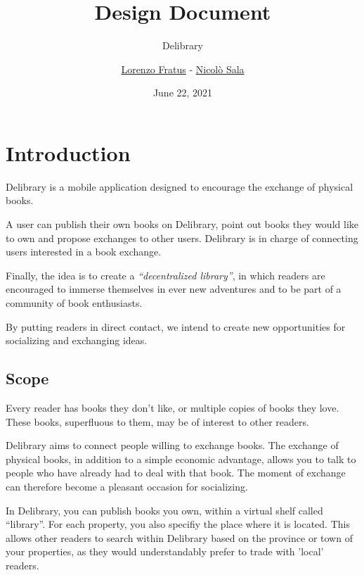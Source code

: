 
\graphicspath{ {assets/} }

\title{Design Document}
\subtitle{Delibrary}
\author{\href{https://github.com/lorenzofratus}{Lorenzo Fratus} - \href{https://github.com/nicheosala}{Nicolò Sala}}
\date{June 22, 2021}



\maketitle
\tableofcontents



\chapter{Introduction}
Delibrary is a mobile application designed to encourage the exchange of physical books.

A user can publish their own books on Delibrary, point out books they would like to own and propose exchanges to other users.
Delibrary is in charge of connecting users interested in a book exchange.

Finally, the idea is to create a \emph{``decentralized library''}, in which readers are encouraged to immerse themselves
in ever new adventures and to be part of a community of book enthusiasts.

By putting readers in direct contact, we intend to create new opportunities for socializing and exchanging ideas.

\section{Scope}
Every reader has books they don't like, or multiple copies of books they love.
These books, superfluous to them, may be of interest to other readers.

Delibrary aims to connect people willing to exchange books.
The exchange of physical books, in addition to a simple economic advantage, allows you to talk to people who have already had to deal with that book.
The moment of exchange can therefore become a pleasant occasion for socializing.

In Delibrary, you can publish books you own, within a virtual shelf called ``library''.
For each property, you also specifiy the place where it is located. This allows other readers to search within Delibrary based on the province or town of your properties,
as they would understandably prefer to trade with 'local' readers.

